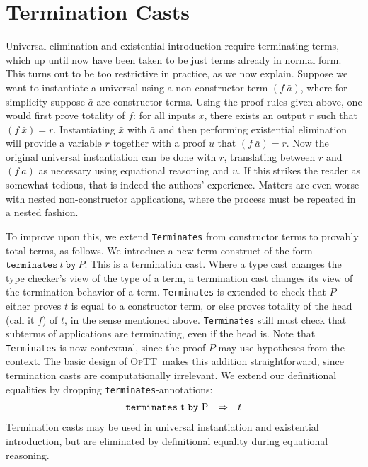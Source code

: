 \documentclass[9pt,natbib]{sigplanconf}
\newcommand{\optt}{\textsc{OpTT}}
\newcommand{\To}{\Rightarrow}
\begin{document}
\section{Termination Casts}
\label{sec:terminates}

Universal elimination and existential introduction require terminating
terms, which up until now have been taken to be just terms already in
normal form.  This turns out to be too restrictive in practice, as we
now explain.  Suppose we want to instantiate a universal using a
non-constructor term $(f\ \bar{a})$, where for simplicity suppose
$\bar{a}$ are constructor terms.  Using the proof rules given above,
one would first prove totality of $f$: for all inputs $\bar{x}$, there
exists an output $r$ such that $(f\ \bar{x}) = r$.  Instantiating
$\bar{x}$ with $\bar{a}$ and then performing existential elimination
will provide a variable $r$ together with a proof $u$ that $(f\
\bar{a}) = r$.  Now the original universal instantiation can be done
with $r$, translating between $r$ and $(f\ \bar{a})$ as necessary
using equational reasoning and $u$.  If this strikes the reader as
somewhat tedious, that is indeed the authors' experience.  Matters are
even worse with nested non-constructor applications, where the process
must be repeated in a nested fashion.

To improve upon this, we extend \texttt{Terminates} from constructor
terms to provably total terms, as follows.  We introduce a new term
construct of the form $\texttt{terminates}\ t\ \texttt{by}\ P$.  This
is a termination cast.  Where a type cast changes the type checker's
view of the type of a term, a termination cast changes its view of the
termination behavior of a term.  \texttt{Terminates} is extended to
check that $P$ either proves $t$ is equal to a constructor term, or
else proves totality of the head (call it $f$) of $t$, in the sense
mentioned above.  \texttt{Terminates} still must check that subterms
of applications are terminating, even if the head is.  Note that
\texttt{Terminates} is now contextual, since the proof $P$ may use
hypotheses from the context. The basic design of \optt\ makes this
addition straightforward, since termination casts are computationally
irrelevant.  We extend our definitional equalities by dropping
\texttt{terminates}-annotations:
\[
\begin{array}{lll}
$\texttt{terminates}\ t\ \texttt{by}\ P$ & \To & t
\end{array}
\]
\noindent Termination casts may be used in universal instantiation and
existential introduction, but are eliminated by definitional equality
during equational reasoning.
\end{document}
